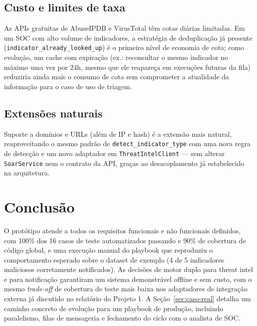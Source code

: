 \documentclass[11pt,a4paper]{article}
\begin{document}
\subsection{Custo e limites de taxa}

As APIs gratuitas de AbuseIPDB e VirusTotal têm cotas diárias limitadas. Em um SOC com
alto volume de indicadores, a estratégia de deduplicação já presente
(\texttt{indicator\_already\_looked\_up}) é o primeiro nível de economia de cota;
como evolução, um cache com expiração (ex.: reconsultar o mesmo indicador no máximo uma
vez por 24h, mesmo que ele reapareça em execuções futuras da fila) reduziria ainda mais
o consumo de cota sem comprometer a atualidade da informação para o caso de uso de
triagem.

\subsection{Extensões naturais}

Suporte a domínios e URLs (além de IP e hash) é a extensão mais natural, reaproveitando
o mesmo padrão de \texttt{detect\_indicator\_type} com uma nova regra de detecção e um
novo adaptador em \texttt{ThreatIntelClient} --- sem alterar \texttt{SoarService} nem o
contrato da API, graças ao desacoplamento já estabelecido na arquitetura.

\section{Conclusão}

O protótipo atende a todos os requisitos funcionais e não funcionais definidos, com
100\% dos 16 casos de teste automatizados passando e 90\% de cobertura de código
global, e uma execução manual do playbook que reproduziu o comportamento esperado
sobre o dataset de exemplo (4 de 5 indicadores maliciosos corretamente notificados).
As decisões de motor duplo para threat intel e para notificação garantiram um sistema
demonstrável offline e sem custo, com o mesmo \emph{trade-off} de cobertura de teste
mais baixa nos adaptadores de integração externa já discutido no relatório do Projeto
1. A Seção~\ref{sec:caso-real} detalha um caminho concreto de evolução para um
playbook de produção, incluindo paralelismo, filas de mensageria e fechamento do ciclo
com o analista de SOC.
\end{document}
